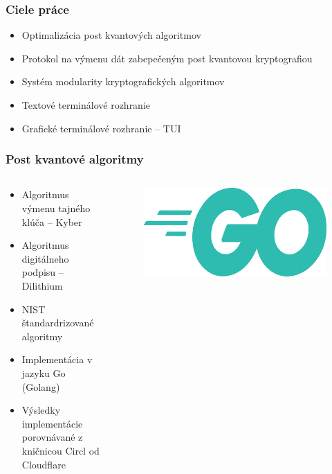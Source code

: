 \documentclass[%
  14pt,       				%
	t,                  %
	aspectratio=1610,   %
	unicode,						%
]{beamer}				    	%
\begin{document}
\disablenavigationsymbols


\maketitle
\newcommand{\npm}[2]{{#1}\,$\pm\,{#2}\%$}

\begin{frame}[c]
	\frametitle{Ciele práce}
	\large{\begin{itemize}
			\item Optimalizácia post kvantových algoritmov
			\item Protokol na výmenu dát zabepečeným post kvantovou kryptografiou
			\item Systém modularity kryptografických algoritmov
			\item Textové terminálové rozhranie
			\item Grafické terminálové rozhranie -- TUI
		\end{itemize}
	}
\end{frame}

\begin{frame}[c]
	\frametitle{Post kvantové algoritmy}
	\begin{columns}[T]
		\begin{column}{0.8\textwidth}
			\large{\begin{itemize}
					\item Algoritmus výmenu tajného klúča -- Kyber
					\item Algoritmus digitálneho podpisu -- Dilithium
					\item NIST štandardrizované algoritmy
					\item Implementácia v jazyku Go (Golang)
					\item Výsledky implementácie porovnávané z kničnicou Circl od Cloudflare
				\end{itemize}
			}
		\end{column}
		\begin{column}{0.2\textwidth}
			\begin{figure}
				\includegraphics[width=\linewidth]{presentation_pictures/Golang_Logo.png}
			\end{figure}
		\end{column}
	\end{columns}
\end{frame}
\end{document}
